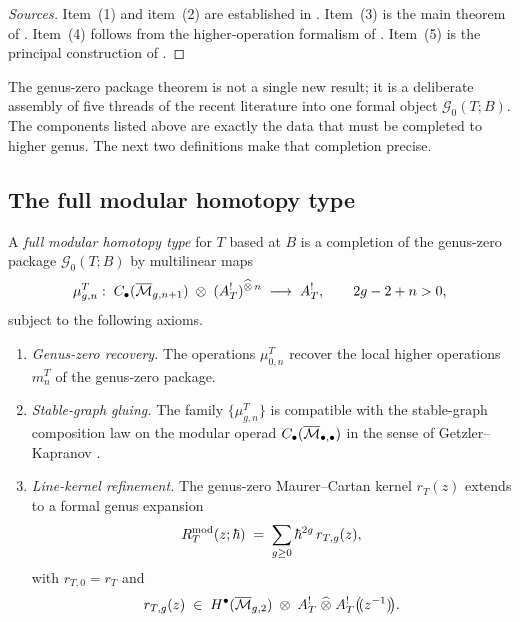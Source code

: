 \begin{proof}[Sources]
Item~\textup{(1)} and item~\textup{(2)} are established in
\cite{CDG20}. Item~\textup{(3)} is the main theorem of \cite{Zeng23}. Item~\textup{(4)}
follows from the higher-operation formalism of \cite{GKW25}. Item~\textup{(5)} is the
principal construction of \cite{DNP25}.
\end{proof}

\begin{remark}
The genus-zero package theorem is not a single new result; it is a deliberate assembly of five
threads of the recent literature into one formal object $\mathcal G_0(T;B)$. The components listed above are exactly the data that must be completed to higher genus.
The next two definitions make that completion precise.
\end{remark}

\subsection{The full modular homotopy type}

\begin{definition}
A \emph{full modular homotopy type} for $T$ based at $B$ is a completion of the genus-zero
package $\mathcal G_0(T;B)$ by multilinear maps
\begin{equation}
\mu_{g,n}^T:\;
C_\bullet(\overline{\mathcal M}_{g,n+1})\;\otimes\;(A_T^!)^{\widehat\otimes\, n}
\;\longrightarrow\;A_T^!,
\qquad 2g-2+n>0,
\end{equation}
subject to the following axioms.
\begin{enumerate}[label=\textup{(\alph*)}]
\item \emph{Genus-zero recovery.} The operations $\mu_{0,n}^T$ recover the local higher
operations $m_n^T$ of the genus-zero package.

\item \emph{Stable-graph gluing.} The family $\{\mu_{g,n}^T\}$ is compatible with the
stable-graph composition law on the modular operad
$C_\bullet(\overline{\mathcal M}_{\bullet,\bullet})$ in the sense of Getzler--Kapranov \cite{GeK98}.

\item \emph{Line-kernel refinement.} The genus-zero Maurer--Cartan kernel $r_T(z)$ extends to
a formal genus expansion
\begin{equation}
R_T^{\mathrm{mod}}(z;\hbar)
\;=\;\sum_{g\ge 0}\hbar^{2g}\,r_{T,g}(z),
\end{equation}
with $r_{T,0}=r_T$ and
\[
r_{T,g}(z)\;\in\;
H^\bullet(\overline{\mathcal M}_{g,2})\;\otimes\;A_T^!\;\widehat\otimes\;A_T^!\bigl(\!(z^{-1})\!\bigr).
\]
\end{enumerate}
\end{definition}

